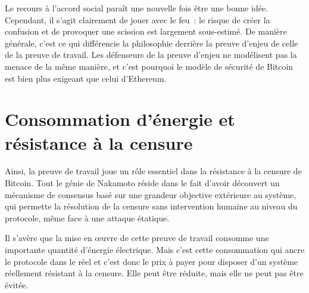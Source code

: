 Le recours à l'accord social paraît une nouvelle fois être une bonne idée. Cependant, il s'agit clairement de jouer avec le feu~: le risque de créer la confusion et de provoquer une scission est largement sous-estimé. De manière générale, c'est ce qui différencie la philosophie derrière la preuve d'enjeu de celle de la preuve de travail. Les défenseurs de la preuve d'enjeu ne modélisent pas la menace de la même manière, et c'est pourquoi le modèle de sécurité de Bitcoin est bien plus exigeant que celui d'Ethereum.

%


\section*{Consommation d'énergie et résistance à la censure}

Ainsi, la preuve de travail joue un rôle essentiel dans la résistance à la censure de Bitcoin. Tout le génie de Nakamoto réside dans le fait d'avoir découvert un mécanisme de consensus basé sur une grandeur objective extérieure au système, qui permette la résolution de la censure sans intervention humaine au niveau du protocole, même face à une attaque étatique.

Il s'avère que la mise en œuvre de cette preuve de travail consomme une importante quantité d'énergie électrique. Mais c'est cette consommation qui ancre le protocole dans le réel et c'est donc le prix à payer pour disposer d'un système réellement résistant à la censure. Elle peut être réduite, mais elle ne peut pas être évitée.

